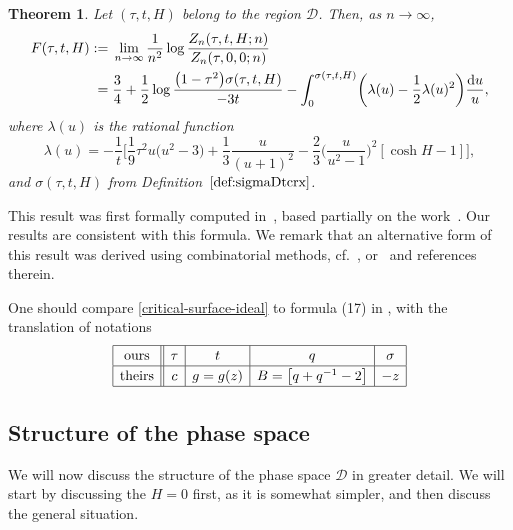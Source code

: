 \documentclass[pdftex]{sigma}
\numberwithin{equation}{section}
\newtheorem{Theorem}{Theorem}[section]
\begin{document}
\begin{Theorem}\label{main-theorem}
 Let $(\tau,t,H)$ belong to the region $\mathcal D$. Then, as $n\to \infty$,
 \begin{align}\label{Kazakov-Free-Energy}
 F(\tau,t,H):={}&\lim_{n\to \infty} \frac{1}{n^2}\log \frac{ Z_{n}(\tau,t,H;n) }{ Z_{n}(\tau,0,0;n)} \nonumber \\
={}& \frac{3}{4} + \frac{1}{2}\log \frac{\bigl(1-\tau^2\bigr)\sigma(\tau,t,H)}{-3t} - \int_{0}^{\sigma(\tau,t,H)}\biggl(\lambda(u)-\frac{1}{2}\lambda(u)^2\biggr) \frac{{\rm d}u}{u},
\end{align}
 where $\lambda(u)$ is the rational function
 \begin{equation*}
 \lambda(u) = -\frac{1}{t}\biggl[\frac{1}{9}\tau^2u\bigl(u^2-3\bigr) + \frac{1}{3}\frac{u}{(u+1)^2} - \frac{2}{3}\biggl(\frac{u}{u^2-1}\biggr)^2[\cosh H -1]\biggr],
 \end{equation*}
 and $\sigma(\tau,t,H)$ from Definition~$\ref{def:sigmaDtcrx}$.
 \end{Theorem}

 This result was first formally computed in~\cite{Kazakov2, Kazakov1}, based partially on the work~\cite{Mehta}. Our results are consistent with this formula. We remark that an alternative form of this result was derived using combinatorial methods, cf.~\cite{BDFG}, or~\cite{Eynard-book}
 and references therein.
 \begin{Remark}
 One should compare \eqref{critical-surface-ideal} to formula (17) in \cite{Kazakov2}, with the translation of notations
$$\renewcommand{\arraystretch}{1.2}
 \begin{array}{|c||c|c|c|c|}
 \hline
 \text{ours} & \tau & t & q & \sigma\\
 \hline
 \text{theirs} & c & g = g(z) & B = \bigl[q+q^{-1}-2\bigr] & -z\\
 \hline
 \end{array}
$$
 \end{Remark}
 \subsection{Structure of the phase space}
 We will now discuss the structure of the phase space $\mathcal D$ in greater detail. We will start by discussing the $H=0$ first, as it is somewhat simpler, and then discuss the general situation.
\end{document}
